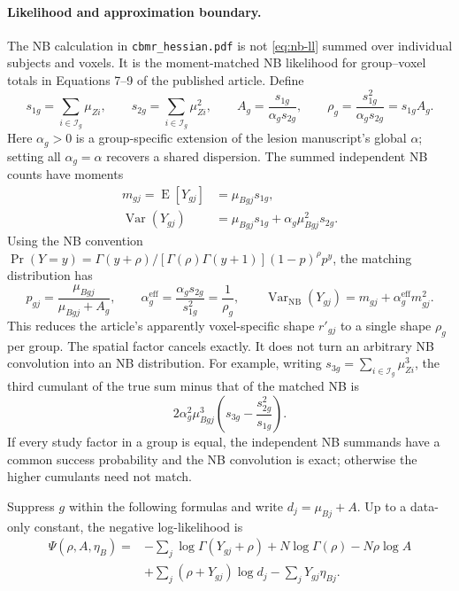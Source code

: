 \documentclass[11pt,a4paper]{article}
\newcommand{\E}{\operatorname{E}}
\newcommand{\Var}{\operatorname{Var}}
\numberwithin{equation}{section}
\begin{document}
\paragraph{Likelihood and approximation boundary.}
The NB calculation in \texttt{cbmr\_hessian.pdf} is not
\eqref{eq:nb-ll} summed over individual subjects and voxels.
It is the moment-matched NB likelihood for group--voxel totals in
Equations 7--9 of the published article. Define
\begin{equation}
 s_{1g}=\sum_{i\in\mathcal I_g}\mu_{Zi},\qquad
 s_{2g}=\sum_{i\in\mathcal I_g}\mu_{Zi}^2,\qquad
 A_g=\frac{s_{1g}}{\alpha_gs_{2g}},\qquad
 \rho_g=\frac{s_{1g}^2}{\alpha_gs_{2g}}=s_{1g}A_g.
\end{equation}
Here $\alpha_g>0$ is a group-specific extension of the lesion manuscript's global
$\alpha$; setting all $\alpha_g=\alpha$ recovers a shared dispersion.
The summed independent NB counts have moments
\begin{align}
 m_{gj}=\E[Y_{gj}]&=\mu_{Bgj}s_{1g},\\
 \Var(Y_{gj})&=\mu_{Bgj}s_{1g}
                    +\alpha_g\mu_{Bgj}^2s_{2g}.
\end{align}
Using the NB convention
$\Pr(Y=y)=\Gamma(y+\rho)/[\Gamma(\rho)\Gamma(y+1)](1-p)^\rho p^y$,
the matching distribution has
\begin{equation}\label{eq:effective}
 p_{gj}=\frac{\mu_{Bgj}}{\mu_{Bgj}+A_g},\qquad
 \alpha_g^{\mathrm{eff}}=\frac{\alpha_gs_{2g}}{s_{1g}^2}
 =\frac1{\rho_g},\qquad
 \Var_{\mathrm{NB}}(Y_{gj})=m_{gj}
                       +\alpha_g^{\mathrm{eff}}m_{gj}^2.
\end{equation}
This reduces the article's apparently voxel-specific shape $r'_{gj}$
to a single shape $\rho_g$ per group. The spatial factor cancels exactly.
It does not turn an arbitrary NB convolution into an NB distribution.
For example, writing $s_{3g}=\sum_{i\in\mathcal I_g}\mu_{Zi}^3$,
the third cumulant of the true sum minus that of the matched NB is
\begin{equation}
 2\alpha_g^2\mu_{Bgj}^3
       \left(s_{3g}-\frac{s_{2g}^2}{s_{1g}}\right).
\end{equation}
If every study factor in a group is equal, the independent NB summands
have a common success probability and the NB convolution is exact;
otherwise the higher cumulants need not match.

Suppress $g$ within the following formulas and write
$d_j=\mu_{Bj}+A$. Up to a data-only constant, the negative log-likelihood is
\begin{equation}\label{eq:psi}
 \begin{split}
 \Psi(\rho,A,\eta_B)={}&-\sum_j\log\Gamma(Y_{gj}+\rho)
 +N\log\Gamma(\rho)-N\rho\log A\\
 &+\sum_j(\rho+Y_{gj})\log d_j-\sum_jY_{gj}\eta_{Bj}.
 \end{split}
\end{equation}
\end{document}

